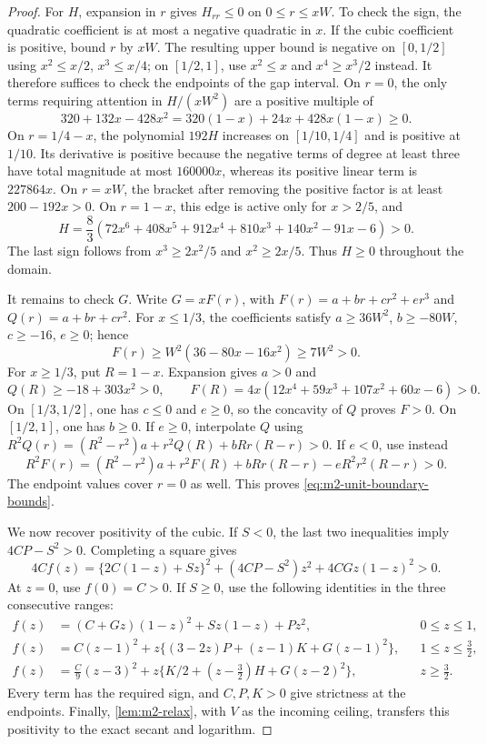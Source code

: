 \begin{proof}
For $H$, expansion in $r$ gives $H_{rr}\le0$ on $0\le r\le xW$.
To check the sign, the quadratic coefficient is at most a negative quadratic in $x$.
If the cubic coefficient is positive, bound $r$ by $xW$.
The resulting upper bound is negative on $[0,1/2]$ using $x^2\le x/2$, $x^3\le x/4$;
on $[1/2,1]$, use $x^2\le x$ and $x^4\ge x^3/2$ instead.
It therefore suffices to check the endpoints of the gap interval.
On $r=0$, the only terms requiring attention in $H/(xW^2)$ are a positive multiple of
\[
 320+132x-428x^2=320(1-x)+24x+428x(1-x)\ge0.
\]
On $r=1/4-x$, the polynomial $192H$ increases on $[1/10,1/4]$ and is positive at $1/10$.
Its derivative is positive because the negative terms of degree at least three have total
magnitude at most $160000x$, whereas its positive linear term is $227864x$.
On $r=xW$, the bracket after removing the positive factor is at least $200-192x>0$.
On $r=1-x$, this edge is active only for $x>2/5$, and
\[
 H=\frac83(72x^6+408x^5+912x^4+810x^3+140x^2-91x-6)>0.
\]
The last sign follows from $x^3\ge2x^2/5$ and $x^2\ge2x/5$.
Thus $H\ge0$ throughout the domain.

It remains to check $G$. Write $G=xF(r)$, with
$F(r)=a+br+cr^2+er^3$ and $Q(r)=a+br+cr^2$.
For $x\le1/3$, the coefficients satisfy
$a\ge36W^2$, $b\ge-80W$, $c\ge-16$, $e\ge0$; hence
\[
 F(r)\ge W^2(36-80x-16x^2)\ge7W^2>0.
\]
For $x\ge1/3$, put $R=1-x$. Expansion gives $a>0$ and
\[
 Q(R)\ge-18+303x^2>0,\qquad
 F(R)=4x(12x^4+59x^3+107x^2+60x-6)>0.
\]
On $[1/3,1/2]$, one has $c\le0$ and $e\ge0$, so the concavity of $Q$ proves $F>0$.
On $[1/2,1]$, one has $b\ge0$.
If $e\ge0$, interpolate $Q$ using
$R^2Q(r)=(R^2-r^2)a+r^2Q(R)+bRr(R-r)>0$.
If $e<0$, use instead
\[
 R^2F(r)=(R^2-r^2)a+r^2F(R)+bRr(R-r)-eR^2r^2(R-r)>0.
\]
The endpoint values cover $r=0$ as well. This proves \eqref{eq:m2-unit-boundary-bounds}.

We now recover positivity of the cubic. If $S<0$, the last two inequalities imply
$4CP-S^2>0$. Completing a square gives
\[
 4Cf(z)=\{2C(1-z)+Sz\}^2+(4CP-S^2)z^2+4CGz(1-z)^2>0.
\]
At $z=0$, use $f(0)=C>0$.
If $S\ge0$, use the following identities in the three consecutive ranges:
\[
 \begin{aligned}
 f(z)&=(C+Gz)(1-z)^2+Sz(1-z)+Pz^2,
       &&0\le z\le1,\\
 f(z)&=C(z-1)^2+z\{(3-2z)P+(z-1)K+G(z-1)^2\},
       &&1\le z\le\tfrac32,\\
 f(z)&=\tfrac C9(z-3)^2+z\{K/2+(z-\tfrac32)H+G(z-2)^2\},
       &&z\ge\tfrac32.
 \end{aligned}
\]
Every term has the required sign, and $C,P,K>0$ give strictness at the endpoints.
Finally, \cref{lem:m2-relax}, with $V$ as the incoming ceiling, transfers this positivity to the
exact secant and logarithm.
\end{proof}

